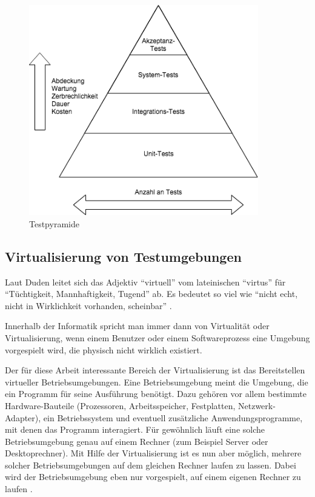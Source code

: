 \begin{figure}[!ht]
  \begin{center}
    \includegraphics[width=10cm]{bilder/testpyramide.png}
    \caption{Testpyramide \citep[Vgl.][]{testpyramide}}
    \label{pyramide}
  \end{center}
\end{figure}



\subsection{Virtualisierung von Testumgebungen}

Laut Duden leitet sich das Adjektiv "`virtuell"' vom lateinischen "`virtus"' für "`Tüchtigkeit, Mannhaftigkeit, Tugend"' ab. Es bedeutet so viel wie "`nicht echt, nicht in Wirklichkeit vorhanden, scheinbar"' \citep[Vgl.][]{duden:001}.

Innerhalb der Informatik spricht man immer dann von Virtualität oder Virtualisierung, wenn einem Benutzer oder einem Softwareprozess eine Umgebung vorgespielt wird, die physisch nicht wirklich existiert.

Der für diese Arbeit interessante Bereich der Virtualisierung ist das Bereitstellen virtueller Betriebsumgebungen. Eine Betriebsumgebung meint die Umgebung, die ein Programm für seine Ausführung benötigt. Dazu gehören vor allem bestimmte Hardware-Bauteile (Prozessoren, Arbeitsspeicher, Festplatten, Netzwerk-Adapter), ein Betriebssystem und eventuell zusätzliche Anwendungsprogramme, mit denen das Programm interagiert. Für gewöhnlich läuft eine solche Betriebsumgebung genau auf einem Rechner (zum Beispiel Server oder Desktoprechner). Mit Hilfe der Virtualisierung ist es nun aber möglich, mehrere solcher Betriebsumgebungen auf dem gleichen Rechner laufen zu lassen. Dabei wird der Betriebsumgebung eben nur vorgespielt, auf einem eigenen Rechner zu laufen \citep[Vgl.][Abstract]{DamMohAnd12}.

